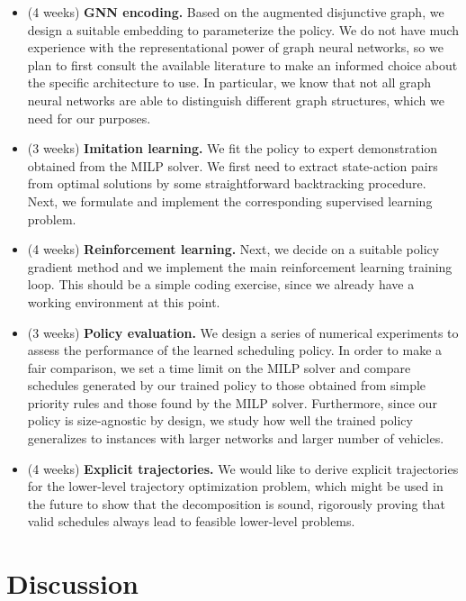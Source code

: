 \documentclass{article}
\theoremstyle{definition}
\theoremstyle{plain}
\begin{document}
\begin{itemize}
  \item (4 weeks) \textbf{GNN encoding.} Based on the augmented disjunctive graph, we design
        a suitable embedding to parameterize the policy. We do not have much
        experience with the representational power of graph neural networks, so
        we plan to first consult the available literature to make an informed
        choice about the specific architecture to use. In particular, we know
        that not all graph neural networks are able to distinguish different
        graph structures, which we need for our purposes.

  \item (3 weeks) \textbf{Imitation learning.} We fit the policy to expert demonstration
        obtained from the MILP solver. We first need to extract state-action
        pairs from optimal solutions by some straightforward backtracking
        procedure. Next, we formulate and implement the corresponding supervised
        learning problem.

  \item (4 weeks) \textbf{Reinforcement learning.} Next, we decide on a suitable
        policy gradient method and we implement the main reinforcement learning
        training loop. This should be a simple coding exercise, since we already
        have a working environment at this point.

  \item (3 weeks) \textbf{Policy evaluation.} We design a series of numerical experiments to
        assess the performance of the learned scheduling policy. In order to
        make a fair comparison, we set a time limit on the MILP solver and
        compare schedules generated by our trained policy to those obtained from
        simple priority rules and those found by the MILP solver.
        Furthermore, since our policy is size-agnostic by design, we study how
        well the trained policy generalizes to instances with larger networks
        and larger number of vehicles.

  \item (4 weeks) \textbf{Explicit trajectories.} We would like to derive explicit
        trajectories for the lower-level trajectory optimization problem, which
        might be used in the future to show that the decomposition is sound,
        rigorously proving that valid schedules always lead to feasible
        lower-level problems.
\end{itemize}


\section{Discussion}
\end{document}
